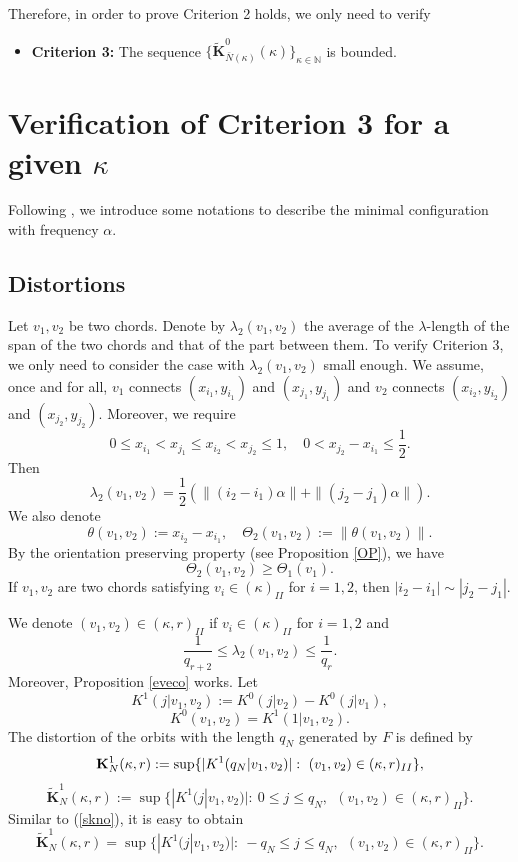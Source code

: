 \documentclass{amsart}
\newcounter{item}[section]
\theoremstyle{definition}
\newcommand{\gm}{\gamma}
\begin{document}
Therefore, in order to prove Criterion 2 holds, we only need to verify
\begin{itemize}
	\item {\bf Criterion 3:}   The sequence  $\{\widetilde{\mathbf{K}}_{\bar{N}(\kappa)}^0(\kappa)\}_{\kappa\in \mathbb{N}}$ is bounded.
\end{itemize}

\vspace{2em}




\section{Verification of Criterion 3 for a given $\kappa$}\label{se4}
Following \cite{KO1}, we introduce some notations  to describe the minimal configuration with frequency $\alpha$.
\subsection{Distortions}
Let $v_1,v_2$ be two  chords. Denote by $\lambda_2(v_1,v_2)$ the average of the $\lambda$-length of the span of the two chords and that of the part  between them. To verify Criterion 3, we only need to consider the case with $\lambda_2(v_1,v_2)$ small enough. We assume, once and for all, $v_1$ connects $(x_{i_1},y_{i_1})$ and  $(x_{j_1},y_{j_1})$ and  $v_2$ connects $(x_{i_2},y_{i_2})$ and  $(x_{j_2},y_{j_2})$. Moreover, we require
\[0\leq x_{i_1}<x_{j_1}\leq x_{i_2}<x_{j_2}\leq 1,\quad 0<x_{j_2}-x_{i_1}\leq \frac{1}{2}. \]
Then
\[\lambda_2(v_1,v_2)=\frac{1}{2}(\|(i_2-i_1)\alpha\|+\|(j_2-j_1)\alpha\|).\]
We also denote
\[\theta(v_1,v_2):=x_{i_2}-x_{i_1},\quad \Theta_2(v_1,v_2):=\|\theta(v_1,v_2)\|.\]
By  the orientation preserving property (see Proposition \ref{OP}), we have
\begin{equation}\label{thev1}
\Theta_2(v_1,v_2)\geq \Theta_1(v_1).
\end{equation}
If  $v_1,v_2$ are two  chords satisfying $v_i\in (\kappa)_{II}$ for $i=1,2$, then $|i_2-i_1|\sim |j_2-j_1|$.

We denote $(v_1,v_2)\in (\kappa,r)_{II}$ if   $v_i\in (\kappa)_{II}$ for $i=1,2$ and
\[\frac{1}{q_{r+2}}\leq\lambda_2(v_1,v_2)\leq \frac{1}{q_{r}}.\]
Moreover, Proposition \ref{eveco} works.
Let \[K^1(j|v_1,v_2):=K^0(j|v_2)-K^0(j|v_1),\]
\[{K^0(v_1,v_2)=K^1(1|v_1,v_2)}.\]
The distortion of the orbits with the length $q_N$ generated by $F$ is defined by
\[\bold{K}_N^1(\kappa,r):=\sup\{|K^1(q_N|v_1,v_2)|:\ (v_1,v_2)\in (\kappa,r)_{II}\},\]
\begin{equation}\label{distK}
\widetilde{\mathbf{K}}_N^1(\kappa,r):=\sup\{|K^1(j|v_1,v_2)|:\ 0\leq j\leq q_N,\ \ (v_1,v_2)\in (\kappa,r)_{II}\}.
\end{equation}
Similar to (\ref{skno}), it is easy to obtain
\[\widetilde{\mathbf{K}}_N^1(\kappa,r)=\sup\{|K^1(j|v_1,v_2)|:\ -q_N\leq j\leq q_N,\ \ (v_1,v_2)\in (\kappa,r)_{II}\}.\]
\end{document}
